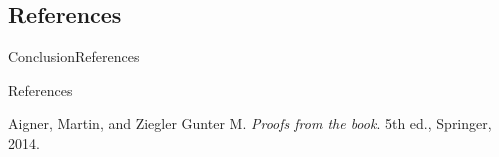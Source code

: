 \documentclass[10pt]{beamer}
\theoremstyle{definition}
\newcommand{\Sfour}{Conclusion}
\newcommand{\SfourSSreference}{References}
\begin{document}
\subsection{\SfourSSreference}
\begin{frame}{\Sfour}{\SfourSSreference}
\begin{block}{\SfourSSreference}
\begin{thebibliography}{9}
Aigner, Martin, and Ziegler Gunter M. 
\textit{Proofs from the book}. 
5th ed., Springer, 2014.
\end{thebibliography}
\end{block}
  
\end{frame}

\end{document}
